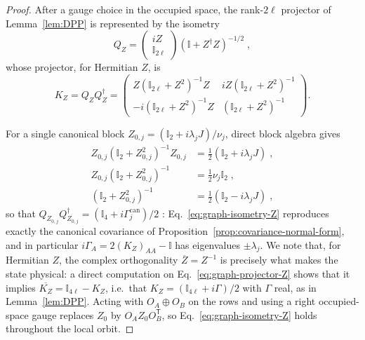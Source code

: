 \documentclass[aps,prl,twocolumn,superscriptaddress,reprint,longbibliography,nofootinbib]{revtex4-2}
\newcommand{\trans}{\mathsf{T}}
\begin{document}
\begin{proof}
After a gauge choice in the occupied space, the rank-$2\ell$ projector of Lemma~\ref{lem:DPP} is represented by the isometry
\begin{equation}
    Q_Z=\begin{pmatrix}iZ\\ \mathbb{I}_{2\ell}\end{pmatrix}\left(\mathbb{I}+Z^\dagger Z\right)^{-1/2}\;,
    \label{eq:graph-isometry-Z}
\end{equation}
whose projector, for Hermitian $Z$, is
\begin{equation}
    K_Z=Q_ZQ_Z^\dagger=\begin{pmatrix} Z(\mathbb{I}_{2\ell}+Z^2)^{-1}Z& iZ(\mathbb{I}_{2\ell}+Z^2)^{-1}\\[2pt] -i(\mathbb{I}_{2\ell}+Z^2)^{-1}Z&(\mathbb{I}_{2\ell}+Z^2)^{-1}\end{pmatrix}.
    \label{eq:graph-projector-Z}
\end{equation}


For a single canonical block $Z_{0,j}=(\mathbb{I}_2+i\lambda_jJ)/\nu_j$, direct block algebra gives
\begin{equation}
\begin{split}
    Z_{0,j}(\mathbb{I}_2+Z_{0,j}^2)^{-1}Z_{0,j}&=\tfrac12(\mathbb{I}_2+i\lambda_jJ)\;,\\
    Z_{0,j}(\mathbb{I}_2+Z_{0,j}^2)^{-1}&=\tfrac12\nu_j\mathbb{I}_2\;,\\
    (\mathbb{I}_2+Z_{0,j}^2)^{-1}&=\tfrac12(\mathbb{I}_2-i\lambda_jJ)\;,
    \end{split}
\end{equation}
so that $Q_{Z_{0,j}}Q_{Z_{0,j}}^\dagger=(\mathbb{I}_4+i\Gamma^{\mathrm{can}}_j)/2$ : Eq.~\eqref{eq:graph-isometry-Z} reproduces exactly the canonical covariance of Proposition~\ref{prop:covariance-normal-form}, and in particular $i\Gamma_A=2(K_Z)_{AA}-\mathbb{I}$ has eigenvalues $\pm\lambda_j$. We note that, for Hermitian $Z$, the complex orthogonality $\overline{Z}=Z^{-1}$ is precisely what makes the state physical: a direct computation on Eq.~\eqref{eq:graph-projector-Z} shows that it implies $\overline{K_Z}=\mathbb{I}_{4\ell}-K_Z$, i.e.\ that $K_Z=(\mathbb{I}_{4\ell}+i\Gamma)/2$ with $\Gamma$ real, as in Lemma~\ref{lem:DPP}. Acting with $O_A\oplus O_B$ on the rows and using a right occupied-space gauge replaces $Z_0$ by $O_AZ_0O_B^{\trans}$, so Eq.~\eqref{eq:graph-isometry-Z} holds throughout the local orbit.


\end{proof}
\end{document}
